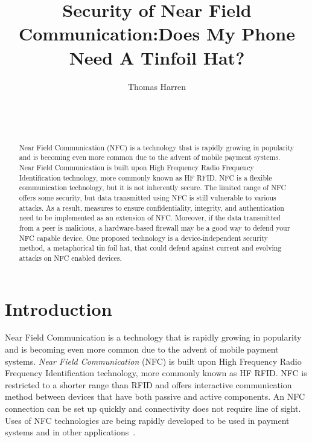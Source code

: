 \documentclass{sig-alternate}
\begin{document}

\title{Security of Near Field Communication:\break Does My Phone Need A Tinfoil Hat?}


\author{
\alignauthor
Thomas Harren\\
	\\
	\\
	\\
}

\maketitle
\begin{abstract}
Near Field Communication (NFC) is a technology that is rapidly growing in popularity and is becoming even more common due to the advent of mobile payment systems. Near Field Communication  is built upon High Frequency Radio Frequency Identification technology, more commonly known as HF RFID. NFC is a flexible communication technology, but it is not inherently secure. The limited range of NFC offers some security, but data transmitted using NFC is still vulnerable to various attacks. As a result, measures to ensure confidentiality, integrity, and authentication need to be implemented as an extension of NFC. Moreover, if the data transmitted from a peer is malicious, a hardware-based firewall may be a good way to defend your NFC capable device. One proposed technology is a device-independent security method, a metaphorical tin foil hat, that could defend against current and evolving attacks on NFC enabled devices.
\end{abstract}


\section{Introduction}
\label{sec:introduction}
Near Field Communication is a technology that is rapidly growing in popularity and is becoming even more common due to the advent of mobile payment systems. \textit{Near Field Communication} (NFC) is built upon High Frequency Radio Frequency Identification technology, more commonly known as HF RFID. NFC is restricted to a shorter range than RFID and offers interactive communication method between devices that have both passive and active components. An NFC connection can be set up quickly and connectivity does not require line of sight. Uses of NFC technologies are being rapidly developed to be used in payment systems and in other applications~\cite{Gum2013}.
\end{document}
